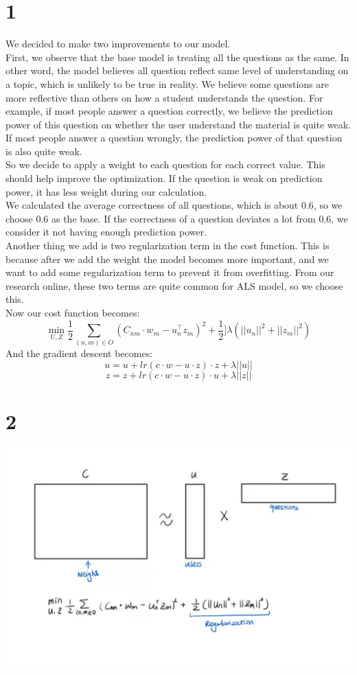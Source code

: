 \documentclass[12pt]{article}
\begin{document}
	\section*{1}
	We decided to make two improvements to our model.\\
	First, we observe that the base model is treating all the questions as the same. In other word, the model believes all question reflect same level of understanding on a topic, which is unlikely to be true in reality. We believe some questions are more reflective than others on how a student understands the question. For example, if most people answer a question correctly, we believe the prediction power of this question on whether the user understand the material is quite weak. If most people answer a question wrongly, the prediction power of that question is also quite weak.\\
	So we decide to apply a weight to each question for each correct value. This should help improve the optimization. If the question is weak on prediction power, it has less weight during our calculation.\\
	We calculated the average correctness of all questions, which is about $0.6$, so we choose $0.6$ as the base. If the correctness of a question deviates a lot from $0.6$, we consider it not having enough prediction power.\\
	Another thing we add is two regularization term in the cost function. This is because after we add the weight the model becomes more important, and we want to add some regularization term to prevent it from overfitting. From our research online, these two terms are quite common for ALS model, so we choose this.\\
	Now our cost function becomes:
	\[\min_{U,Z}\frac{1}{2}\sum_{(n,m)\in O}(C_{nm}\cdot w_{m}-u_n^\top z_m)^2+\frac{1}{2}]\lambda(||u_n||^2+||z_m||^2)\]
	And the gradient descent becomes:
	\[u=u+lr(c\cdot w-u\cdot z)\cdot z+\lambda ||u||\]
	\[z=z+lr(c\cdot w-u\cdot z)\cdot u+\lambda ||z||\]
	
	\section*{2}
	\includegraphics[scale=0.5]{b2}
	
\end{document}

